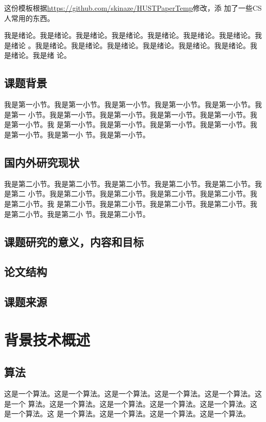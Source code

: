 \documentclass[supercite]{HustGraduPaper}
\theoremstyle{definition}
\begin{document}
这份模板根据\url{https://github.com/skinaze/HUSTPaperTemp}\cite{ski17}修改，添
加了一些CS人常用的东西。

我是绪论。我是绪论。我是绪论。我是绪论。我是绪论。我是绪论。我是绪论。我是绪论
。我是绪论。我是绪论。我是绪论。我是绪论。我是绪论。我是绪论。我是绪论。我是绪
论。

\subsection{课题背景}

我是第一小节。我是第一小节。我是第一小节。我是第一小节。我是第一小节。我是第一
小节。我是第一小节。我是第一小节。我是第一小节。我是第一小节。我是第一小节。我
是第一小节。我是第一小节。我是第一小节。我是第一小节。我是第一小节。我是第一小
节。我是第一小节。

\subsection{国内外研究现状}

我是第二小节。我是第二小节。我是第二小节。我是第二小节。我是第二小节。我是第二
小节。我是第二小节。我是第二小节。我是第二小节。我是第二小节。我是第二小节。我
是第二小节。我是第二小节。我是第二小节。我是第二小节。我是第二小节。我是第二小
节。我是第二小节。


\subsection{课题研究的意义，内容和目标}
\subsection{论文结构}
\subsection{课题来源}

\section{背景技术概述}

\subsection{算法}

这是一个算法。这是一个算法。这是一个算法。这是一个算法。这是一个算法。这是一个
算法。这是一个算法。这是一个算法。这是一个算法。这是一个算法。这是一个算法。这
是一个算法。这是一个算法。这是一个算法。这是一个算法。
\end{document}
